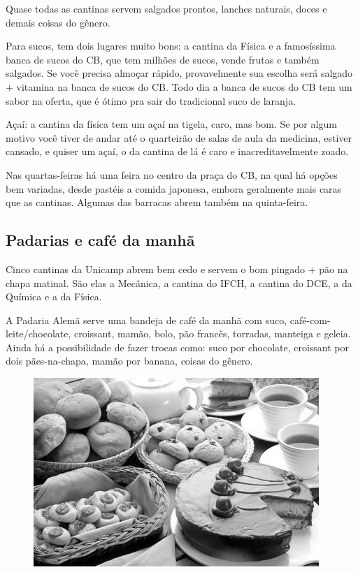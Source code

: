 Quase todas as cantinas servem salgados prontos, lanches naturais, doces
e demais coisas do gênero.

Para sucos, tem dois lugares muito bons: a cantina da Física e a famosíssima
banca de sucos do CB, que tem milhões de sucos, vende frutas e também salgados.
Se você precisa almoçar rápido, provavelmente sua escolha será salgado
+ vitamina na banca de sucos do CB. Todo dia a banca de sucos do CB tem um sabor
na oferta, que é ótimo pra sair do tradicional suco de laranja.

Açaí: a cantina da física tem um açaí na tigela, caro, mas bom. Se por algum
motivo você tiver de andar até o quarteirão de salas de aula da medicina,
estiver cansado, e quiser um açaí, o da cantina de lá é caro
e inacreditavelmente zoado.

Nas quartas-feiras há uma feira no centro da praça do CB, na qual há opções bem
variadas, desde pastéis a comida japonesa, embora geralmente mais caras que as
cantinas. Algumas das barracas abrem também na quinta-feira.

\subsection{Padarias e café da manhã}

Cinco cantinas da Unicamp abrem bem cedo e servem o bom pingado + pão na chapa
matinal. São elas a Mecânica, a cantina do IFCH, a cantina do DCE, a da Química
e a da Física.

A Padaria Alemã serve uma bandeja de café da manhã com suco,
café-com-leite/chocolate, croissant, mamão, bolo, pão francês, torradas,
manteiga e geleia. Ainda há a possibilidade de fazer trocas como: suco por
chocolate, croissant por dois pães-na-chapa, mamão por banana, coisas do gênero.
\begin{figure}[h!]
    \centering
    \includegraphics[scale=0.68,keepaspectratio=true]{img/imgs/6-comida/padaria.jpg}
\end{figure}

